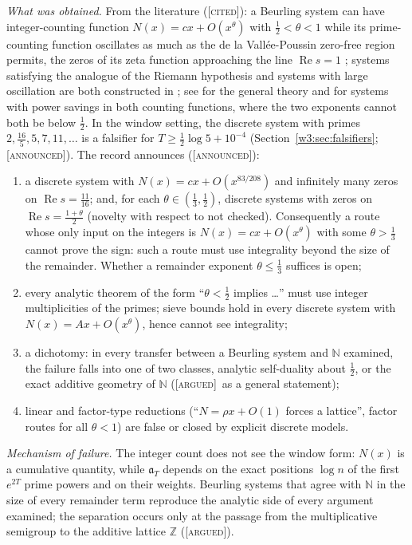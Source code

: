 \documentclass[11pt]{amsart}
\theoremstyle{definition}
\theoremstyle{remark}
\numberwithin{equation}{section}
\newcommand{\N}{\mathbb{N}}
\newcommand{\Z}{\mathbb{Z}}
\DeclareMathOperator{\Rel}{Re}
\newcommand{\aT}{\mathfrak{a}_T}                       %
\newcommand{\stag}[1]{\textsc{[#1]}}
\newcommand{\CITED}{\stag{cited}}
\newcommand{\ARGUED}{\stag{argued}}
\newcommand{\ANNOUNCED}{\stag{announced}}
\newcommand{\entry}[1]{\par\smallskip\noindent\textit{#1.}\enspace}
\begin{document}
\entry{What was obtained} From the literature (\CITED): a Beurling system can have integer-counting function
$N(x)=cx+O(x^\theta)$ with $\frac12<\theta<1$ while its prime-counting function oscillates as much as the de la
Vall\'ee-Poussin zero-free region permits, the zeros of its zeta function approaching the line $\Rel s=1$
\cite{DMV2006}; systems satisfying the analogue of the Riemann hypothesis and systems with large oscillation are
both constructed in \cite{Zhang2007}; see \cite{DiamondZhang2016} for the general theory and \cite{BDR2023} for
systems with power savings in both counting functions, where the two exponents cannot both be below $\frac12$. In the window setting, the discrete system with primes $2,\frac{16}5,5,7,11,\dots$ is a
falsifier for $T\ge\frac12\log5+10^{-4}$ (Section~\ref{w3:sec:falsifiers}; \ANNOUNCED). The record announces
(\ANNOUNCED):
\begin{enumerate}[label=(\alph*)]
\item a discrete system with $N(x)=cx+O(x^{83/208})$ and infinitely many zeros on $\Rel s=\frac{11}{16}$; and, for each $\theta\in(\frac13,\frac12)$, discrete systems with zeros on $\Rel s=\frac{1+\theta}2$ (novelty
with respect to \cite{DiamondZhang2016} not checked). Consequently a route whose only input on the integers is
$N(x)=cx+O(x^\theta)$ with some $\theta>\frac13$ cannot prove the sign: such a route must use integrality beyond
the size of the remainder. Whether a remainder exponent $\theta\le\frac13$ suffices is open;
\item every analytic theorem of the form ``$\theta<\frac12$ implies \dots'' must use integer multiplicities of the
primes; sieve bounds hold in every discrete system with $N(x)=Ax+O(x^\theta)$, hence cannot see integrality;
\item a dichotomy: in every transfer between a Beurling system and $\N$ examined, the failure falls into one of
two classes, analytic self-duality about $\frac12$, or the exact additive geometry of $\N$ (\ARGUED\ as a general
statement);
\item linear and factor-type reductions (``$N=\rho x+O(1)$ forces a lattice'', factor routes for all $\theta<1$)
are false or closed by explicit discrete models.
\end{enumerate}

\entry{Mechanism of failure} The integer count does not see the window form: $N(x)$ is a cumulative
quantity, while $\aT$ depends on the exact positions $\log n$ of the first $e^{2T}$ prime powers and on their
weights. Beurling systems that agree with $\N$ in the size of every remainder term reproduce the analytic
side of every argument examined; the separation occurs only at the passage from the multiplicative semigroup
to the additive lattice $\Z$ (\ARGUED).
\end{document}
